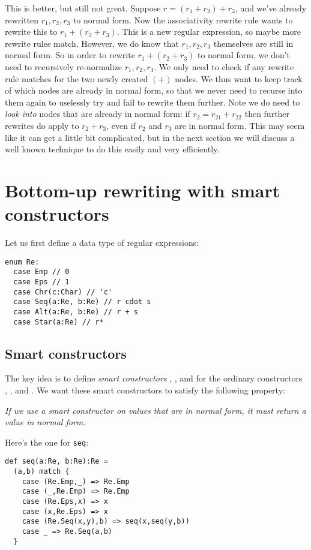 This is better, but still not great. Suppose $r = (r_1 + r_2) + r_3$, and we've already rewritten $r_1,r_2,r_3$ to normal form. Now the associativity rewrite rule wants to rewrite this to $r_1 + (r_2 + r_3)$. This is a new regular expression, so maybe more rewrite rules match. However, we do know that $r_1, r_2, r_3$ themselves are still in normal form. So in order to rewrite $r_1 + (r_2 + r_3)$ to normal form, we don't need to recursively re-normalize $r_1, r_2, r_3$. We only need to check if any rewrite rule matches for the two newly created $(+)$ nodes. We thus want to keep track of which nodes are already in normal form, so that we never need to recurse into them again to uselessly try and fail to rewrite them further. Note we do need to \emph{look into} nodes that are already in normal form: if $r_2 = r_{21} + r_{22}$ then further rewrites do apply to $r_2 + r_3$, even if $r_2$ and $r_3$ are in normal form. This may seem like it can get a little bit complicated, but in the next section we will discuss a well known technique to do this easily and very efficiently.



\section{Bottom-up rewriting with smart constructors}

Let us first define a data type of regular expressions:

\begin{lstlisting}
enum Re:
  case Emp // 0
  case Eps // 1
  case Chr(c:Char) // 'c'
  case Seq(a:Re, b:Re) // r cdot s
  case Alt(a:Re, b:Re) // r + s
  case Star(a:Re) // r*
\end{lstlisting}

\subsection{Smart constructors}

The key idea is to define \emph{smart constructors} , , and  for the ordinary constructors , , and . We want these smart constructors to satisfy the following property:

\emph{If we use a smart constructor on values that are in normal form, it must return a value in normal form.}

Here's the one for \lstinline|seq|:

\begin{lstlisting}
def seq(a:Re, b:Re):Re =
  (a,b) match {
    case (Re.Emp,_) => Re.Emp
    case (_,Re.Emp) => Re.Emp
    case (Re.Eps,x) => x
    case (x,Re.Eps) => x
    case (Re.Seq(x,y),b) => seq(x,seq(y,b))
    case _ => Re.Seq(a,b)
  }
\end{lstlisting}


